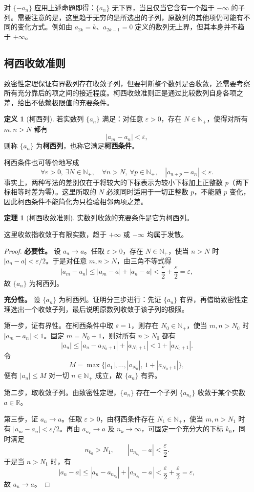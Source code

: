 \documentclass[UTF8, fontset=fandol, a4paper, 12pt]{ctexart}
\newcommand{\R}{\mathbb R}
\newcommand{\Nplus}{\mathbb N_{+}}
\theoremstyle{definition}
\newtheorem*{definition}{定义}
\newtheorem{theorem}{定理}
\begin{document}
对 $\{-a_n\}$ 应用上述命题即得：$\{a_n\}$ 无下界，当且仅当它含有一个趋于 $-\infty$ 的子列。需要注意的是，这里趋于无穷的是所选出的子列，原数列的其他项仍可能有不同的变化方式。例如由 $a_{2k}=k$、$a_{2k-1}=0$ 定义的数列无上界，但其本身并不趋于 $+\infty$。

\subsection*{柯西收敛准则}
致密性定理保证有界数列存在收敛子列，但要判断整个数列是否收敛，还需要考察所有充分靠后的项之间的接近程度。柯西收敛准则正是通过比较数列自身各项之差，给出不依赖极限值的充要条件。

\begin{definition}[柯西列]
若实数列 $\{a_n\}$ 满足：对任意 $\varepsilon>0$，存在 $N\in\Nplus$，使得对所有 $m,n>N$ 都有
\[
|a_m-a_n|<\varepsilon,
\]
则称 $\{a_n\}$ 为\textbf{柯西列}，也称它满足\textbf{柯西条件}。
\end{definition}

柯西条件也可等价地写成
\[
\forall\varepsilon>0,\ \exists N\in\Nplus,\quad
\forall n>N,\ \forall p\in\Nplus,\quad
|a_{n+p}-a_n|<\varepsilon.
\]
事实上，两种写法的差别仅在于将较大的下标表示为较小下标加上正整数 $p$（两下标相等时差为零）。这里所取的 $N$ 必须同时适用于一切正整数 $p$，不能随 $p$ 变化，因此柯西条件不能简化为只检验相邻两项之差。

\begin{theorem}[柯西收敛准则]
实数列收敛的充要条件是它为柯西列。
\end{theorem}
这里收敛指收敛于有限实数，趋于 $+\infty$ 或 $-\infty$ 均属于发散。
\begin{proof}
\textbf{必要性。} 设 $a_n\to a$。任取 $\varepsilon>0$，存在 $N\in\Nplus$，使当 $n>N$ 时 $|a_n-a|<\varepsilon/2$。于是对任意 $m,n>N$，由三角不等式得
\[
|a_m-a_n|\le|a_m-a|+|a_n-a|
<\frac{\varepsilon}{2}+\frac{\varepsilon}{2}
=\varepsilon,
\]
故 $\{a_n\}$ 为柯西列。

\textbf{充分性。} 设 $\{a_n\}$ 为柯西列。证明分三步进行：先证 $\{a_n\}$ 有界，再借助致密性定理选出一个收敛子列，最后说明原数列收敛于该子列的极限。

第一步，证有界性。在柯西条件中取 $\varepsilon=1$，则存在 $N_0\in\Nplus$，使当 $m,n>N_0$ 时 $|a_m-a_n|<1$。固定 $m=N_0+1$，则对所有 $n>N_0$ 都有
\[
|a_n|\le|a_n-a_{N_0+1}|+|a_{N_0+1}|
<1+|a_{N_0+1}|.
\]
令
\[
M=\max\bigl\{|a_1|,\ldots,|a_{N_0}|,\,
1+|a_{N_0+1}|\bigr\},
\]
便有 $|a_n|\le M$ 对一切 $n\in\Nplus$ 成立，故 $\{a_n\}$ 有界。

第二步，取收敛子列。由致密性定理，$\{a_n\}$ 存在一个子列 $\{a_{n_k}\}$ 收敛于某个实数 $a\in\R$。

第三步，证 $a_n\to a$。任取 $\varepsilon>0$，由柯西条件存在 $N_1\in\Nplus$，使当 $m,n>N_1$ 时有 $|a_m-a_n|<\varepsilon/2$。再由 $a_{n_k}\to a$ 及 $n_k\to\infty$，可固定一个充分大的下标 $k_0$，同时满足
\[
n_{k_0}>N_1,\qquad |a_{n_{k_0}}-a|<\frac{\varepsilon}{2}.
\]
于是当 $n>N_1$ 时，有
\[
|a_n-a|\le|a_n-a_{n_{k_0}}|+|a_{n_{k_0}}-a|
<\frac{\varepsilon}{2}+\frac{\varepsilon}{2}
=\varepsilon,
\]
故 $a_n\to a$。
\end{proof}
\end{document}
